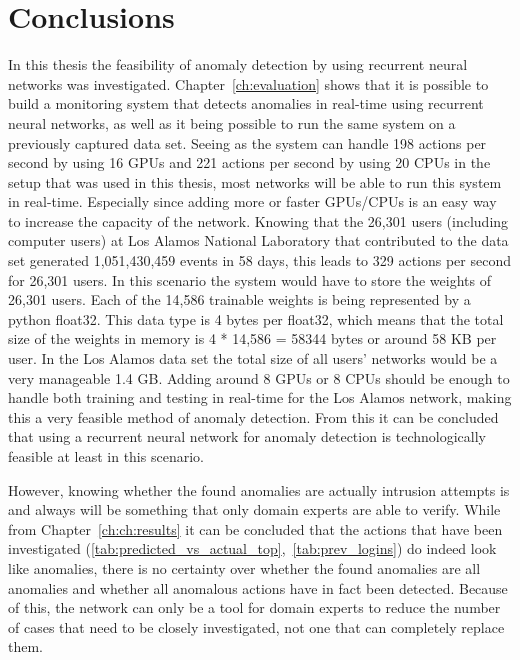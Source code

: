 \chapter{Conclusions}\label{ch:conclusions}

In this thesis the feasibility of anomaly detection by using recurrent neural networks was investigated. Chapter~\ref{ch:evaluation} shows that it is possible to build a monitoring system that detects anomalies in real-time using recurrent neural networks, as well as it being possible to run the same system on a previously captured data set. Seeing as the system can handle 198 actions per second by using 16 GPUs and 221 actions per second by using 20 CPUs in the setup that was used in this thesis, most networks will be able to run this system in real-time. Especially since adding more or faster GPUs/CPUs is an easy way to increase the capacity of the network. Knowing that the 26,301 users (including computer users) at Los Alamos National Laboratory that contributed to the data set generated 1,051,430,459 events in 58 days, this leads to 329 actions per second for 26,301 users. In this scenario the system would have to store the weights of 26,301 users. Each of the 14,586 trainable weights is being represented by a python float32. This data type is 4 bytes per float32, which means that the total size of the weights in memory is 4 * 14,586 = 58344 bytes or around 58 KB per user. In the Los Alamos data set the total size of all users' networks would be a very manageable 1.4 GB. Adding around 8 GPUs or 8 CPUs should be enough to handle both training and testing in real-time for the Los Alamos network, making this a very feasible method of anomaly detection. From this it can be concluded that using a recurrent neural network for anomaly detection is technologically feasible at least in this scenario. 

However, knowing whether the found anomalies are actually intrusion attempts is and always will be something that only domain experts are able to verify. While from Chapter~\ref{ch:ch:results} it can be concluded that the actions that have been investigated (\ref{tab:predicted_vs_actual_top},~\ref{tab:prev_logins}) do indeed look like anomalies, there is no certainty over whether the found anomalies are all anomalies and whether all anomalous actions have in fact been detected. Because of this, the network can only be a tool for domain experts to reduce the number of cases that need to be closely investigated, not one that can completely replace them. 

